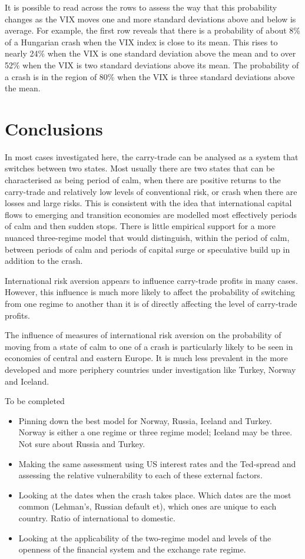 \documentclass[12pt, a4paper, oneside]{article}\usepackage[]{graphicx}\usepackage[]{color}
\begin{document}
It is possible to read across the rows to assess the way that this probability changes as the VIX moves one and more standard deviations above and below is average.  For example, the first row reveals that there is a probability of about 8\% of a Hungarian crash when the VIX index is close to its mean. This rises to nearly 24\% when the VIX is one standard deviation above the mean and to over 52\% when the VIX is two standard deviations above its mean.  The probability of a crash is in the region of 80\% when the VIX is three standard deviations above the mean.  

\section{Conclusions}
In most cases investigated here, the carry-trade can be analysed as a system that switches between two states.  Most usually there are two states that can be characterised as being period of calm, when there are positive returns to the carry-trade and relatively low levels of conventional risk, or crash when there are losses and large risks.  This is consistent with the idea that international capital flows to emerging and transition economies are modelled most effectively periods of calm and then sudden stops.  There is little empirical support for a more nuanced three-regime model that would distinguish, within the period of calm, between periods of calm and periods of capital surge or speculative build up in addition to the crash. 

International risk aversion appears to influence carry-trade profits in many cases.  However, this influence is much more likely to affect the probability of switching from one regime to another than it is of directly affecting the level of carry-trade profits. 

The influence of measures of international risk aversion on the probability of moving from a state of calm to one of a crash is particularly likely to be seen in economies of central and eastern Europe.  It is much less prevalent in the more developed and more periphery countries under investigation like Turkey, Norway and Iceland. 

To be completed
\begin{itemize}
\item Pinning down the best model for Norway, Russia, Iceland and Turkey. Norway is either a one regime or three regime model; Iceland may be three.  Not sure about Russia and Turkey. 
\item Making the same assessment using US interest rates and the Ted-spread and assessing the relative vulnerability to each of these external factors. 
\item Looking at the dates when the crash takes place.  Which dates are the most common (Lehman's, Russian default et), which ones are unique to each country.  Ratio of international to domestic. 
\item Looking at the applicability of the two-regime model and levels of the openness of the financial system and the exchange rate regime.  
\end{itemize}
\end{document}
